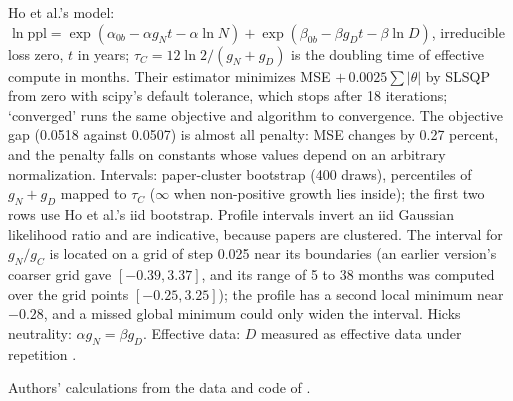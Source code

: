 \begin{table}[tp]
\begin{tablenotes}
Ho et al.'s model: $\ln\text{ppl}=\exp(\alpha_{0b}-\alpha g_Nt-\alpha\ln N)+\exp(\beta_{0b}-\beta g_Dt-\beta\ln D)$, irreducible loss zero, $t$ in years; $\tau_C=12\ln2/(g_N+g_D)$ is the doubling time of effective compute in months. Their estimator minimizes MSE $+\,0.0025\sum|\theta|$ by SLSQP from zero with scipy's default tolerance, which stops after 18 iterations; `converged' runs the same objective and algorithm to convergence. The objective gap (0.0518 against 0.0507) is almost all penalty: MSE changes by 0.27 percent, and the penalty falls on constants whose values depend on an arbitrary normalization. Intervals: paper-cluster bootstrap (400 draws), percentiles of $g_N+g_D$ mapped to $\tau_C$ ($\infty$ when non-positive growth lies inside); the first two rows use Ho et al.'s iid bootstrap. Profile intervals invert an iid Gaussian likelihood ratio and are indicative, because papers are clustered. The interval for $g_N/g_C$ is located on a grid of step 0.025 near its boundaries (an earlier version's coarser grid gave $[-0.39,3.37]$, and its range of 5 to 38 months was computed over the grid points $[-0.25,3.25]$); the profile has a second local minimum near $-0.28$, and a missed global minimum could only widen the interval. Hicks neutrality: $\alpha g_N=\beta g_D$. Effective data: $D$ measured as effective data under repetition \citep{muennighoff2023scaling}.
\end{tablenotes}
\begin{tablenotes}[Source]
Authors' calculations from the data and code of \citet{ho2024algorithmic}.
\end{tablenotes}
\end{table}
